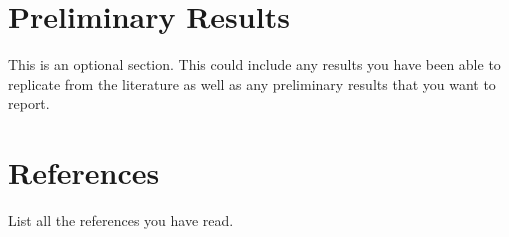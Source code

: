 \documentclass[10pt,twocolumn,letterpaper]{article}
\begin{document}
\section{Preliminary Results}
\label{sec:prelim_results}
This is an optional section. This could include any results you have been able to replicate from the literature as well as any preliminary results that you want to report.

\section{References}
List all the references you have read.

{\small


}
\end{document}
